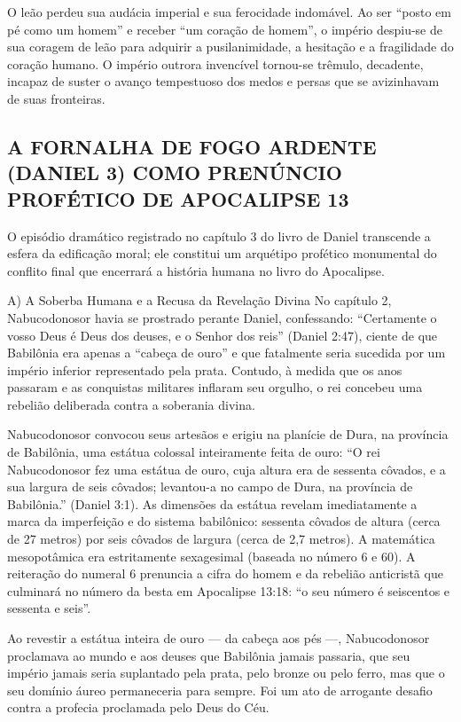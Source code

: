 \documentclass[11pt,a4paper,openany]{book}
\begin{document}
O leão perdeu sua audácia imperial e sua ferocidade indomável. Ao ser ``posto em pé como um homem'' e receber ``um coração de homem'', o império despiu-se de sua coragem de leão para adquirir a pusilanimidade, a hesitação e a fragilidade do coração humano. O império outrora invencível tornou-se trêmulo, decadente, incapaz de suster o avanço tempestuoso dos medos e persas que se avizinhavam de suas fronteiras.



\subsection{A FORNALHA DE FOGO ARDENTE (DANIEL 3) COMO PRENÚNCIO PROFÉTICO DE APOCALIPSE 13}


O episódio dramático registrado no capítulo 3 do livro de Daniel transcende a esfera da edificação moral; ele constitui um arquétipo profético monumental do conflito final que encerrará a história humana no livro do Apocalipse.

A) A Soberba Humana e a Recusa da Revelação Divina
No capítulo 2, Nabucodonosor havia se prostrado perante Daniel, confessando: ``Certamente o vosso Deus é Deus dos deuses, e o Senhor dos reis'' (Daniel 2:47), ciente de que Babilônia era apenas a ``cabeça de ouro'' e que fatalmente seria sucedida por um império inferior representado pela prata. Contudo, à medida que os anos passaram e as conquistas militares inflaram seu orgulho, o rei concebeu uma rebelião deliberada contra a soberania divina.

Nabucodonosor convocou seus artesãos e erigiu na planície de Dura, na província de Babilônia, uma estátua colossal inteiramente feita de ouro:
``O rei Nabucodonosor fez uma estátua de ouro, cuja altura era de sessenta côvados, e a sua largura de seis côvados; levantou-a no campo de Dura, na província de Babilônia.'' (Daniel 3:1).
As dimensões da estátua revelam imediatamente a marca da imperfeição e do sistema babilônico: sessenta côvados de altura (cerca de 27 metros) por seis côvados de largura (cerca de 2,7 metros). A matemática mesopotâmica era estritamente sexagesimal (baseada no número 6 e 60). A reiteração do numeral 6 prenuncia a cifra do homem e da rebelião anticristã que culminará no número da besta em Apocalipse 13:18: ``o seu número é seiscentos e sessenta e seis''.

Ao revestir a estátua inteira de ouro — da cabeça aos pés —, Nabucodonosor proclamava ao mundo e aos deuses que Babilônia jamais passaria, que seu império jamais seria suplantado pela prata, pelo bronze ou pelo ferro, mas que o seu domínio áureo permaneceria para sempre. Foi um ato de arrogante desafio contra a profecia proclamada pelo Deus do Céu.
\end{document}
